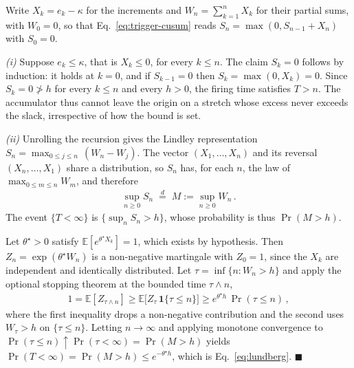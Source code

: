 \documentclass[letterpaper, 10 pt, conference]{ieeeconf}  %
\newcommand{\E}{\mathbb{E}}
\begin{document}
Write $X_k = e_k - \kappa$ for the increments and $W_n = \sum_{k=1}^{n} X_k$ for their partial sums, with $W_0 = 0$, so that Eq.~\ref{eq:trigger-cusum} reads $S_n = \max(0, S_{n-1} + X_n)$ with $S_0 = 0$.

\emph{(i)} Suppose $e_k \leq \kappa$, that is $X_k \leq 0$, for every $k \leq n$.
The claim $S_k = 0$ follows by induction: it holds at $k = 0$, and if $S_{k-1} = 0$ then $S_k = \max(0, X_k) = 0$.
Since $S_k = 0 \not> h$ for every $k \leq n$ and every $h > 0$, the firing time satisfies $T > n$.
The accumulator thus cannot leave the origin on a stretch whose excess never exceeds the slack, irrespective of how the bound is set.

\emph{(ii)} Unrolling the recursion gives the Lindley representation $S_n = \max_{0 \leq j \leq n}\,(W_n - W_j)$.
The vector $(X_1, \dots, X_n)$ and its reversal $(X_n, \dots, X_1)$ share a distribution, so $S_n$ has, for each $n$, the law of $\max_{0 \leq m \leq n} W_m$, and therefore
\begin{align} \label{eq:lindley}
    \sup_{n \geq 0} S_n \;\overset{d}{=}\; M := \sup_{n \geq 0} W_n \,.
\end{align}
The event $\{T < \infty\}$ is $\{\sup_n S_n > h\}$, whose probability is thus $\Pr(M > h)$.

Let $\theta^{\star} > 0$ satisfy $\E[e^{\theta^{\star} X_k}] = 1$, which exists by hypothesis.
Then $Z_n = \exp(\theta^{\star} W_n)$ is a non-negative martingale with $Z_0 = 1$, since the $X_k$ are independent and identically distributed.
Let $\tau = \inf\{n : W_n > h\}$ and apply the optional stopping theorem at the bounded time $\tau \wedge n$,
\begin{align} \label{eq:stopping}
    1 = \E[Z_{\tau \wedge n}] \geq \E\big[Z_{\tau}\,\mathbf{1}\{\tau \leq n\}\big] \geq e^{\theta^{\star} h}\,\Pr(\tau \leq n) \,,
\end{align}
where the first inequality drops a non-negative contribution and the second uses $W_{\tau} > h$ on $\{\tau \leq n\}$.
Letting $n \to \infty$ and applying monotone convergence to $\Pr(\tau \leq n) \uparrow \Pr(\tau < \infty) = \Pr(M > h)$ yields $\Pr(T < \infty) = \Pr(M > h) \leq e^{-\theta^{\star} h}$, which is Eq.~\ref{eq:lundberg}. \hfill$\blacksquare$
\end{document}
